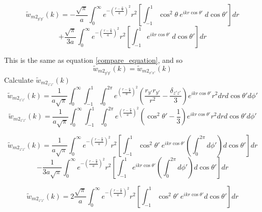 \documentclass[double,12pt]{beavtex}
\begin{document}
\begin{displaymath}{\widetilde{w}_{{m2}_{y'y'}}(k)=-\frac{\sqrt{\pi}}{a}\int_{0}^{\infty}e^{-\left(\frac{r-\frac{\alpha}{2}}{a}\right)^2}r^2\left[\int_{-1}^{1}\cos^2\theta~e^{ikr\cos\theta'}~d{\cos\theta'}\right]d{r}}\end{displaymath} 
\begin{equation}{+\frac{\sqrt{\pi}}{3a}\int_{0}^{\infty}e^{-\left(\frac{r-\frac{\alpha}{2}}{a}\right)^2}r^2\left[\int_{-1}^{1}e^{ikr\cos\theta'}~d{\cos\theta'}\right]d{r}}\end{equation}

This is the same as equation \ref{compare_equation}, and so \begin{equation}{\widetilde{w}_{{m2}_{y'y'}}(k)=\widetilde{w}_{{m2}_{x'x'}}(k)}\end{equation}
Calculate $\widetilde{w}_{{m2}_{z'z'}}(k)$ 
\begin{equation}{\widetilde{w}_{{m2}_{z'z'}}(k)=\frac{1}{a\sqrt{\pi}}\int_{0}^{\infty}\int_{-1}^{1}\int_{0}^{2\pi}e^{\left(\frac{r-\frac{\alpha}{2}}{a}\right)^2}\left(\frac{r_{y'}r_{y'}}{r^2}-\frac{\delta_{z'z'}}{3}\right)e^{ikr\cos\theta'}r^2d{r}d{\cos\theta'}d{\phi'}}\end{equation}
\begin{equation}{\widetilde{w}_{{m2}_{z'z'}}(k)=\frac{1}{a\sqrt{\pi}}\int_{0}^{\infty}\int_{-1}^{1}\int_{0}^{2\pi}e^{\left(\frac{r-\frac{\alpha}{2}}{a}\right)^2}\left(\cos^2\theta'-\frac{1}{3}\right)e^{ikr\cos\theta'}r^2d{r}d{\cos\theta'}d{\phi'}}\end{equation}

\begin{displaymath}{\widetilde{w}_{{m2}_{z'z'}}(k)=\frac{1}{a\sqrt{\pi}}\int_{0}^{\infty}e^{-\left(\frac{r-\frac{\alpha}{2}}{a}\right)^2}r^2\left[\int_{-1}^{1}\cos^2\theta'~e^{ikr\cos\theta'}\left(\int_{0}^{2\pi}d{\phi'}\right)d{\cos\theta'}\right]d{r}}\end{displaymath} 
\begin{equation}{-\frac{1}{3a\sqrt{\pi}}\int_{0}^{\infty}e^{-\left(\frac{r-\frac{\alpha}{2}}{a}\right)^2}r^2\left[\int_{-1}^{1}e^{ikr\cos\theta'}\left(\int_{0}^{2\pi}d{\phi'}\right)d{\cos\theta'}\right]d{r}}\end{equation}

\begin{displaymath}{\widetilde{w}_{{m2}_{z'z'}}(k)=2\frac{\sqrt{\pi}}{a}\int_{0}^{\infty}e^{-\left(\frac{r-\frac{\alpha}{2}}{a}\right)^2}r^2\left[\int_{-1}^{1}\cos^2\theta'~e^{ikr\cos\theta'}d{\cos\theta'}\right]d{r}}\end{displaymath} 
\end{document}
